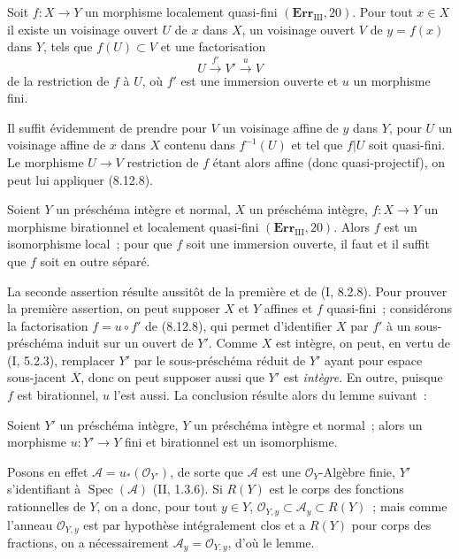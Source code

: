 \begin{corollary}[8.12.9]
\label{IV.8.12.9-fr}
Soit $f:X\to Y$ un morphisme localement quasi-fini
$(\mathbf{Err}_{\mathrm{III}}, 20)$. Pour tout $x\in X$ il existe un
voisinage ouvert $U$ de $x$ dans $X$, un voisinage ouvert $V$ de
$y=f(x)$ dans $Y$, tels que $f(U)\subset V$ et une factorisation
\[
U\xrightarrow{f'}V'\xrightarrow{u}V
\]
de la restriction de $f$ à $U$, où $f'$ est une immersion ouverte et $u$ un
morphisme fini.
\end{corollary}

Il suffit évidemment de prendre pour $V$ un voisinage affine de $y$ dans
$Y$, pour $U$ un voisinage affine de $x$ dans $X$ contenu dans $f^{-1}(U)$
et tel que $f|U$ soit quasi-fini. Le morphisme $U\to V$ restriction de $f$
étant alors affine (donc quasi-projectif), on peut lui appliquer (8.12.8).

\begin{corollary}[8.12.10]
Soient $Y$ un préschéma intègre et normal, $X$ un préschéma intègre,
$f:X\to Y$ un morphisme birationnel et localement quasi-fini
$(\mathbf{Err}_{\mathrm{III}}, 20)$. Alors $f$ est un isomorphisme local~;
pour que $f$ soit une immersion ouverte, il faut et il suffit que $f$ soit
en outre séparé.
\end{corollary}

La seconde assertion résulte aussitôt de la première et de (I, 8.2.8). Pour
prouver la première assertion, on peut supposer $X$ et $Y$ affines et $f$
quasi-fini~; considérons la factorisation $f=u\circ f'$ de (8.12.8), qui
permet d'identifier $X$ par $f'$ à un sous-préschéma induit sur un ouvert de
$Y'$. Comme $X$ est intègre, on peut, en vertu de (I, 5.2.3), remplacer
$Y'$ par le sous-préschéma réduit de $Y'$ ayant pour espace sous-jacent
$\overline X$, donc on peut supposer aussi que $Y'$ est \emph{intègre}. En
outre, puisque $f$ est birationnel, $u$ l'est aussi. La conclusion résulte
alors du lemme suivant~:

\begin{lemma}[8.12.10.1]
\label{IV.8.12.10.1-fr}
Soient $Y'$ un préschéma intègre, $Y$ un préschéma intègre et normal~; alors
un morphisme $u:Y'\to Y$ fini et birationnel est un isomorphisme.
\end{lemma}

Posons en effet $\mathcal A=u_*(\mathcal O_{Y'})$, de sorte que $\mathcal A$
est une $\mathcal O_Y$-Algèbre finie, $Y'$ s'identifiant à
$\operatorname{Spec}(\mathcal A)$ (II, 1.3.6). Si $R(Y)$ est le corps des
fonctions rationnelles de $Y$, on a donc, pour tout $y\in Y$,
$\mathcal O_{Y,y}\subset\mathcal A_y\subset R(Y)$~; mais comme l'anneau
$\mathcal O_{Y,y}$ est par hypothèse intégralement clos et a $R(Y)$ pour
corps des fractions, on a nécessairement
$\mathcal A_y=\mathcal O_{Y,y}$, d'où le lemme.

